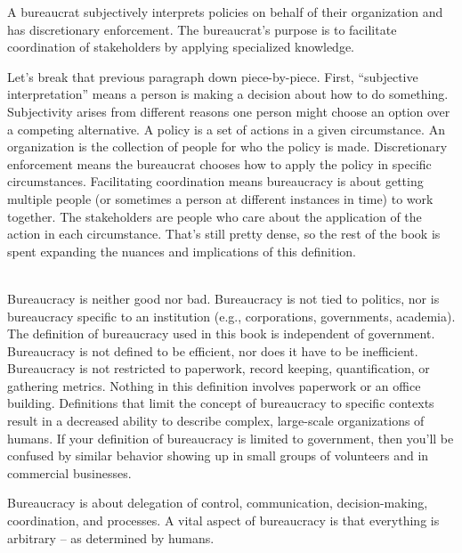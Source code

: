 A \gls{bureaucrat} \iftoggle{glossaryinmargin}{\marginpar{[Glossary]}}{}
subjectively interprets policies on behalf of their organization and has discretionary enforcement. The bureaucrat's purpose is to facilitate coordination of stakeholders by applying specialized knowledge. 

Let's break that previous paragraph down piece-by-piece. First, ``subjective interpretation'' means a person is making a decision about how to do something. Subjectivity arises from different reasons one person might choose an option over a competing alternative.  A \gls{policy} \iftoggle{glossaryinmargin}{\marginpar{[Glossary]}}{}
is a set of actions in a given circumstance. An \gls{organization} is the collection of people for who the policy is made. Discretionary enforcement means the bureaucrat chooses how to apply the policy in specific circumstances. Facilitating coordination means bureaucracy is about getting multiple people (or sometimes a person at different instances in time) to work together. The stakeholders are people who care about the application of the action in each circumstance.  That's still pretty dense, so the rest of the book is spent expanding the nuances and implications of this definition.

\ \\

Bureaucracy is neither good nor bad. Bureaucracy is not tied to politics, nor is bureaucracy specific to an institution (e.g., corporations, governments, academia). The definition of bureaucracy used in this book is independent of government. Bureaucracy is not defined to be efficient, nor does it have to be inefficient. Bureaucracy is not restricted to paperwork, record keeping, quantification, or gathering metrics. Nothing in this definition involves paperwork or an office building. Definitions that limit the concept of bureaucracy to specific contexts result in a decreased ability to describe complex, large-scale organizations of humans. If your definition of bureaucracy is limited to government, then you'll be confused by similar behavior showing up in small groups of volunteers and in commercial businesses.

Bureaucracy is about delegation of control, communication, decision-making, coordination, and processes. 
A vital aspect of bureaucracy is that everything is arbitrary -- as determined by humans.



